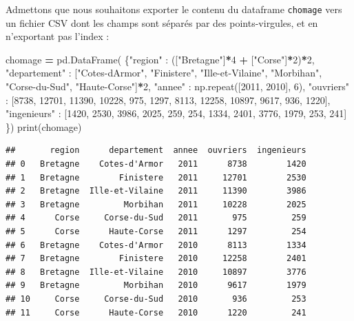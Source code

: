\documentclass[
  12pt,
]{book}
\newenvironment{Shaded}{\begin{snugshade}}{\end{snugshade}}
\newcommand{\BuiltInTok}[1]{#1}
\newcommand{\DecValTok}[1]{\textcolor[rgb]{0.00,0.00,0.81}{#1}}
\newcommand{\NormalTok}[1]{#1}
\newcommand{\OperatorTok}[1]{\textcolor[rgb]{0.81,0.36,0.00}{\textbf{#1}}}
\newcommand{\StringTok}[1]{\textcolor[rgb]{0.31,0.60,0.02}{#1}}
\numberwithin{equation}{section}
\numberwithin{countremarque}{section}
\begin{document}
Admettons que nous souhaitons exporter le contenu du dataframe \texttt{chomage} vers un fichier CSV dont les champs sont séparés par des points-virgules, et en n'exportant pas l'index :

\begin{Shaded}
\begin{Highlighting}[]
\NormalTok{chomage }\OperatorTok{=}\NormalTok{ pd.DataFrame(}
\NormalTok{    \{}\StringTok{"region"}\NormalTok{ : ([}\StringTok{"Bretagne"}\NormalTok{]}\OperatorTok{*}\DecValTok{4} \OperatorTok{+}\NormalTok{ [}\StringTok{"Corse"}\NormalTok{]}\OperatorTok{*}\DecValTok{2}\NormalTok{)}\OperatorTok{*}\DecValTok{2}\NormalTok{,}
     \StringTok{"departement"}\NormalTok{ : [}\StringTok{"Cotes{-}d\textquotesingle{}Armor"}\NormalTok{, }\StringTok{"Finistere"}\NormalTok{,}
                      \StringTok{"Ille{-}et{-}Vilaine"}\NormalTok{, }\StringTok{"Morbihan"}\NormalTok{,}
                      \StringTok{"Corse{-}du{-}Sud"}\NormalTok{, }\StringTok{"Haute{-}Corse"}\NormalTok{]}\OperatorTok{*}\DecValTok{2}\NormalTok{,}
     \StringTok{"annee"}\NormalTok{ : np.repeat([}\DecValTok{2011}\NormalTok{, }\DecValTok{2010}\NormalTok{], }\DecValTok{6}\NormalTok{),}
     \StringTok{"ouvriers"}\NormalTok{ : [}\DecValTok{8738}\NormalTok{, }\DecValTok{12701}\NormalTok{, }\DecValTok{11390}\NormalTok{, }\DecValTok{10228}\NormalTok{, }\DecValTok{975}\NormalTok{, }\DecValTok{1297}\NormalTok{,}
                   \DecValTok{8113}\NormalTok{, }\DecValTok{12258}\NormalTok{, }\DecValTok{10897}\NormalTok{, }\DecValTok{9617}\NormalTok{, }\DecValTok{936}\NormalTok{, }\DecValTok{1220}\NormalTok{],}
     \StringTok{"ingenieurs"}\NormalTok{ : [}\DecValTok{1420}\NormalTok{, }\DecValTok{2530}\NormalTok{, }\DecValTok{3986}\NormalTok{, }\DecValTok{2025}\NormalTok{, }\DecValTok{259}\NormalTok{, }\DecValTok{254}\NormalTok{,}
                     \DecValTok{1334}\NormalTok{, }\DecValTok{2401}\NormalTok{, }\DecValTok{3776}\NormalTok{, }\DecValTok{1979}\NormalTok{, }\DecValTok{253}\NormalTok{, }\DecValTok{241}\NormalTok{]}
\NormalTok{    \})}
\BuiltInTok{print}\NormalTok{(chomage)}
\end{Highlighting}
\end{Shaded}

\begin{lstlisting}
##       region      departement  annee  ouvriers  ingenieurs
## 0   Bretagne    Cotes-d'Armor   2011      8738        1420
## 1   Bretagne        Finistere   2011     12701        2530
## 2   Bretagne  Ille-et-Vilaine   2011     11390        3986
## 3   Bretagne         Morbihan   2011     10228        2025
## 4      Corse     Corse-du-Sud   2011       975         259
## 5      Corse      Haute-Corse   2011      1297         254
## 6   Bretagne    Cotes-d'Armor   2010      8113        1334
## 7   Bretagne        Finistere   2010     12258        2401
## 8   Bretagne  Ille-et-Vilaine   2010     10897        3776
## 9   Bretagne         Morbihan   2010      9617        1979
## 10     Corse     Corse-du-Sud   2010       936         253
## 11     Corse      Haute-Corse   2010      1220         241
\end{lstlisting}
\end{document}
